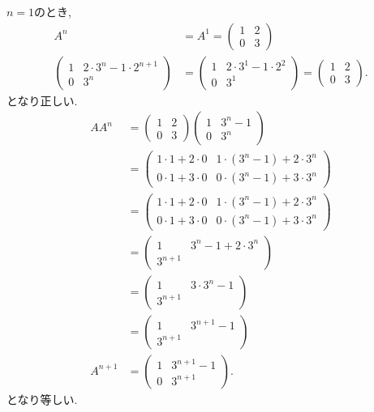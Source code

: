\begin{checkanswer}%
  $n=1$のとき,
  \begin{align*}
    A^n&=A^1=
    \begin{pmatrix}
      1&2\\0&3
    \end{pmatrix}\\  
    \begin{pmatrix}1&2\cdot 3^{n}-1\cdot 2^{n+1}\\0&3^n\end{pmatrix}
      &=
      \begin{pmatrix}1&2\cdot 3^{1}-1\cdot 2^{2}\\0&3^1\end{pmatrix}
        =
    \begin{pmatrix}1&2\\0&3\end{pmatrix}      .
  \end{align*}
  となり正しい.
  \begin{align*}
    AA^n&=
    \begin{pmatrix}
      1&2\\0&3
    \end{pmatrix}
    \begin{pmatrix}1&3^{n}-1\\0&3^n\end{pmatrix}\\
      &=
    \begin{pmatrix}1\cdot 1+2\cdot 0&1\cdot(3^{n}-1)+2\cdot 3^n\\0\cdot 1+3\cdot 0&0\cdot (3^{n}-1)+3\cdot 3^n\end{pmatrix}\\
      &=
    \begin{pmatrix}1\cdot 1+2\cdot 0&1\cdot(3^{n}-1)+2\cdot 3^n\\0\cdot 1+3\cdot 0&0\cdot (3^{n}-1)+3\cdot 3^n\end{pmatrix}\\
      &=
    \begin{pmatrix}1&3^{n}-1+ 2\cdot 3^n\\3^{n+1}\end{pmatrix}\\
      &=
    \begin{pmatrix}1&3\cdot 3^{n}-1\\3^{n+1}\end{pmatrix}\\
      &=
    \begin{pmatrix}1&3^{n+1}-1\\3^{n+1}\end{pmatrix}\\
    A^{n+1}&=\begin{pmatrix}1&3^{n+1}-1\\0&3^{n+1}\end{pmatrix}.
  \end{align*}
  となり等しい.
\end{checkanswer}
